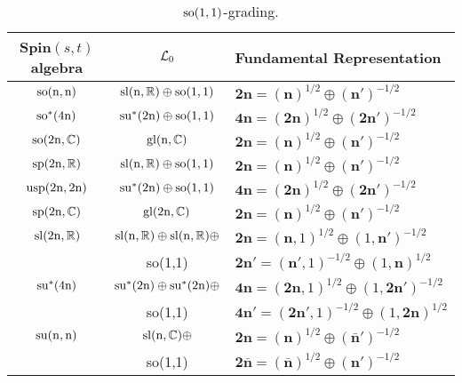 \documentclass[a4paper,12pt]{article}
\begin{document}
\begin{table}[ht]
\begin{center}
\begin{tabular} {|c|c|l|}

\hline

Spin$(s,t)$ algebra& $\mathcal{L}_0$&Fundamental
Representation\\\hline\hline


 $\rm{so}(n,n)$&$\rm{sl}(n,\mathbb{R})\oplus\rm{so}(1,1)$&$\mathbf{2n}=(\mathbf{n})^{1/2}\oplus
 (\mathbf{n'})^{-1/2}$

\\\hline

$\rm{so}^*(4n)$&$\rm{su}^*(2n)\oplus\rm{so}(1,1)$&$\mathbf{4n}=(\mathbf{2n})^{1/2}\oplus
 (\mathbf{2n'})^{-1/2}$

\\\hline

$\rm{so}(2n,\mathbb{C})$&$\rm{gl}(n,\mathbb{C})$&$\mathbf{2n}=(\mathbf{n})^{1/2}\oplus
 (\mathbf{n'})^{-1/2}$

\\\hline

$\rm{sp}(2n,\mathbb{R})$&$\rm{sl}(n,\mathbb{R})\oplus\rm{so}(1,1)$&$\mathbf{2n}=(\mathbf{n})^{1/2}\oplus
 (\mathbf{n'})^{-1/2}$

\\\hline

$\rm{usp}(2n,2n)$&$\rm{su}^*(2n)\oplus\rm{so}(1,1)$&$\mathbf{4n}=(\mathbf{2n})^{1/2}\oplus
 (\mathbf{2n'})^{-1/2}$

\\\hline

$\rm{sp}(2n,\mathbb{C})$&$\rm{gl}(2n,\mathbb{C})$&$\mathbf{2n}=(\mathbf{n})^{1/2}\oplus
 (\mathbf{n'})^{-1/2}$

\\\hline

$\rm{sl}(2n,\mathbb{R})$&$\rm{sl}(n,\mathbb{R})\oplus\rm{sl}(n,\mathbb{R})\oplus
$&$\mathbf{2n}=(\mathbf{n},1)^{1/2}\oplus
 (1,\mathbf{n'})^{-1/2}$\\
 &\rm{so}(1,1)&$\mathbf{2n'}=(\mathbf{n'},1)^{-1/2}\oplus
 (1,\mathbf{n})^{1/2}$

\\\hline

$\rm{su}^*(4n)$&$\rm{su}^*(2n)\oplus\rm{su}^*(2n)\oplus
$&$\mathbf{4n}=(\mathbf{2n},1)^{1/2}\oplus
 (1,\mathbf{2n'})^{-1/2}$\\
 &\rm{so}(1,1)&$\mathbf{4n'}=(\mathbf{2n'},1)^{-1/2}\oplus
 (1,\mathbf{2n})^{1/2}$

\\\hline

$\rm{su}(n,n)$&$\rm{sl}(n,\mathbb{C})\oplus
$&$\mathbf{2n}=(\mathbf{n})^{1/2}\oplus
 (\mathbf{{\bar n}'})^{-1/2}$\\
 &\rm{so}(1,1)&$\mathbf{2{\bar n}}=(\mathbf{{\bar n}})^{1/2}\oplus
 (\mathbf{n'})^{-1/2}$

\\\hline



\end{tabular}
\caption{$\rm{so}(1,1)$-grading.}\label{grade}
\end{center}
\end{table}
\end{document}

